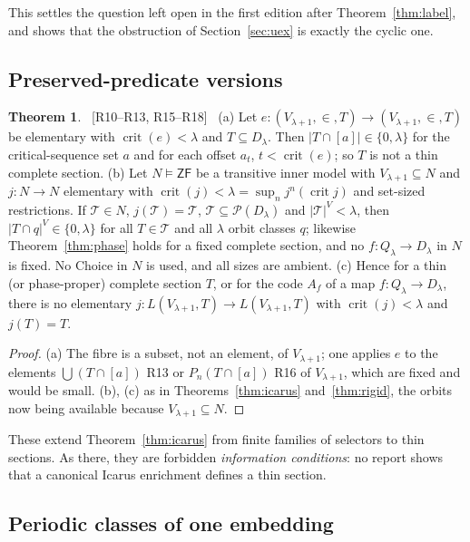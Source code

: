 \documentclass[11pt,letterpaper]{article}
\theoremstyle{definition}
\newtheorem{theorem}[definition]{Theorem}
\numberwithin{equation}{section}
\newcommand{\ZF}{\mathsf{ZF}}
\newcommand{\crit}{\operatorname{crit}}
\newcommand{\Pow}{\mathcal P}
\newcommand{\src}[1]{\unskip\ {\normalfont\small\sffamily\color{Olive}[#1]}\ }
\newcommand{\R}[1]{\textsf{R#1}}
\begin{document}
This settles the question left open in the first edition after Theorem~\ref{thm:label}, and shows that the obstruction of Section~\ref{sec:uex} is exactly the cyclic one.

\subsection{Preserved-predicate versions}

\begin{theorem}\label{thm:preserved}\src{R10--R13, R15--R18}
(a) Let $e:(V_{\lambda+1},\in,T)\to(V_{\lambda+1},\in,T)$ be elementary with $\crit(e)<\lambda$ and $T\subseteq D_\lambda$. Then $|T\cap[a]|\in\{0,\lambda\}$ for the critical-sequence set $a$ and for each offset $a_t$, $t<\crit(e)$; so $T$ is not a thin complete section.
(b) Let $N\models\ZF$ be a transitive inner model with $V_{\lambda+1}\subseteq N$ and $j:N\to N$ elementary with $\crit(j)<\lambda=\sup_nj^n(\crit j)$ and set-sized restrictions. If $\mathcal T\in N$, $j(\mathcal T)=\mathcal T$, $\mathcal T\subseteq\Pow(D_\lambda)$ and $|\mathcal T|^V<\lambda$, then $|T\cap q|^V\in\{0,\lambda\}$ for all $T\in\mathcal T$ and all $\lambda$ orbit classes $q$; likewise Theorem~\ref{thm:phase} holds for a fixed complete section, and no $f:Q_\lambda\to D_\lambda$ in $N$ is fixed. No Choice in $N$ is used, and all sizes are ambient.
(c) Hence for a thin (or phase-proper) complete section $T$, or for the code $A_f$ of a map $f:Q_\lambda\to D_\lambda$, there is no elementary $j:L(V_{\lambda+1},T)\to L(V_{\lambda+1},T)$ with $\crit(j)<\lambda$ and $j(T)=T$.
\end{theorem}

\begin{proof}
(a) The fibre is a subset, not an element, of $V_{\lambda+1}$; one applies $e$ to the elements $\bigcup(T\cap[a])$ \R{13} or $P_n(T\cap[a])$ \R{16} of $V_{\lambda+1}$, which are fixed and would be small. (b), (c) as in Theorems~\ref{thm:icarus} and~\ref{thm:rigid}, the orbits now being available because $V_{\lambda+1}\subseteq N$.
\end{proof}

These extend Theorem~\ref{thm:icarus} from finite families of selectors to thin sections. As there, they are forbidden \emph{information conditions}: no report shows that a canonical Icarus enrichment defines a thin section.

\subsection{Periodic classes of one embedding}
\end{document}

